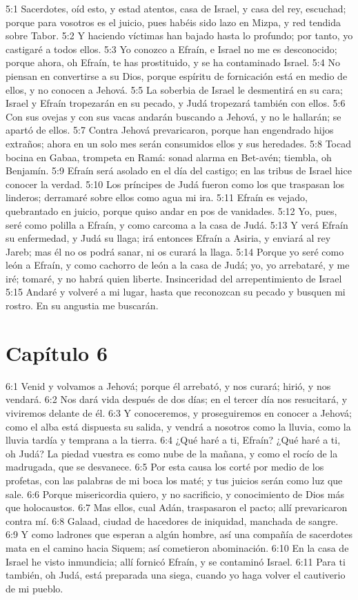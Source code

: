 				5:1 Sacerdotes, oíd esto, y estad atentos, casa de Israel, y casa del rey, escuchad; porque para vosotros es el juicio, pues habéis sido lazo en Mizpa, y red tendida sobre Tabor. 
				5:2 Y haciendo víctimas han bajado hasta lo profundo; por tanto, yo castigaré a todos ellos. 
				5:3 Yo conozco a Efraín, e Israel no me es desconocido; porque ahora, oh Efraín, te has prostituido, y se ha contaminado Israel. 
				5:4 No piensan en convertirse a su Dios, porque espíritu de fornicación está en medio de ellos, y no conocen a Jehová. 
				5:5 La soberbia de Israel le desmentirá en su cara; Israel y Efraín tropezarán en su pecado, y Judá tropezará también con ellos. 
				5:6 Con sus ovejas y con sus vacas andarán buscando a Jehová, y no le hallarán; se apartó de ellos. 
				5:7 Contra Jehová prevaricaron, porque han engendrado hijos extraños; ahora en un solo mes serán consumidos ellos y sus heredades. 
				5:8 Tocad bocina en Gabaa, trompeta en Ramá: sonad alarma en Bet-avén; tiembla, oh Benjamín. 
				5:9 Efraín será asolado en el día del castigo; en las tribus de Israel hice conocer la verdad. 
				5:10 Los príncipes de Judá fueron como los que traspasan los linderos; derramaré sobre ellos como agua mi ira. 
				5:11 Efraín es vejado, quebrantado en juicio, porque quiso andar en pos de vanidades. 
				5:12 Yo, pues, seré como polilla a Efraín, y como carcoma a la casa de Judá. 
				5:13 Y verá Efraín su enfermedad, y Judá su llaga; irá entonces Efraín a Asiria, y enviará al rey Jareb; mas él no os podrá sanar, ni os curará la llaga. 
				5:14 Porque yo seré como león a Efraín, y como cachorro de león a la casa de Judá; yo, yo arrebataré, y me iré; tomaré, y no habrá quien liberte. 
				Insinceridad del arrepentimiento de Israel 
				5:15 Andaré y volveré a mi lugar, hasta que reconozcan su pecado y busquen mi rostro. En su angustia me buscarán. 
				\section*{Capítulo 6 }
					
6:1 Venid y volvamos a Jehová; porque él arrebató, y nos curará; hirió, y nos vendará. 
					6:2 Nos dará vida después de dos días; en el tercer día nos resucitará, y viviremos delante de él. 
					6:3 Y conoceremos, y proseguiremos en conocer a Jehová; como el alba está dispuesta su salida, y vendrá a nosotros como la lluvia, como la lluvia tardía y temprana a la tierra. 
					6:4 ¿Qué haré a ti, Efraín? ¿Qué haré a ti, oh Judá? La piedad vuestra es como nube de la mañana, y como el rocío de la madrugada, que se desvanece. 
					6:5 Por esta causa los corté por medio de los profetas, con las palabras de mi boca los maté; y tus juicios serán como luz que sale. 
					6:6 Porque misericordia quiero, y no sacrificio, y conocimiento de Dios más que holocaustos. 
					6:7 Mas ellos, cual Adán, traspasaron el pacto; allí prevaricaron contra mí. 
					6:8 Galaad, ciudad de hacedores de iniquidad, manchada de sangre. 
					6:9 Y como ladrones que esperan a algún hombre, así una compañía de sacerdotes mata en el camino hacia Siquem; así cometieron abominación. 
					6:10 En la casa de Israel he visto inmundicia; allí fornicó Efraín, y se contaminó Israel. 
					6:11 Para ti también, oh Judá, está preparada una siega, cuando yo haga volver el cautiverio de mi pueblo. 
